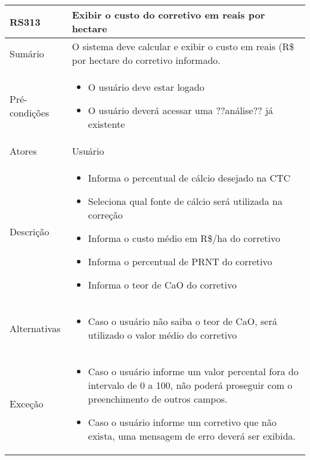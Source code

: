 \begin{quadro}[!htb]
    \begin{tabular}{|p{3cm}|p{11cm}|}
        \hline
        \textbf{RS313} & \textbf{Exibir o custo do corretivo em reais por hectare} \\
        \hline
        Sumário        & O sistema deve calcular e exibir o custo em reais (R\$ por hectare do corretivo informado.                  \\
        \hline
        Pré-condições  & \begin{itemize}
            \item O usuário deve estar logado
            \item O usuário deverá acessar uma ??análise?? já existente 
        \end{itemize}                 \\
        \hline
        Atores         & Usuário                  \\
        \hline
        Descrição      &
        \begin{itemize}
            \item Informa o percentual de cálcio desejado na CTC
            \item Seleciona qual fonte de cálcio será utilizada na correção
            \item Informa o custo médio em R\$/ha do corretivo
            \item Informa o percentual de PRNT do corretivo
            \item Informa o teor de CaO do corretivo
        \end{itemize}                 \\
        \hline
        Alternativas   &
        \begin{itemize}
            \item Caso o usuário não saiba o teor de CaO, será utilizado o valor médio do corretivo
        \end{itemize}                 \\
        \hline
        Exceção        &
        \begin{itemize}
            \item Caso o usuário informe um valor percental fora do intervalo de 0 a 100, não poderá proseguir com o preenchimento de outros campos.
            \item Caso o usuário informe um corretivo que não exista, uma mensagem de erro deverá ser exibida.
        \end{itemize}                   \\
        \hline
    \end{tabular}
\end{quadro}

